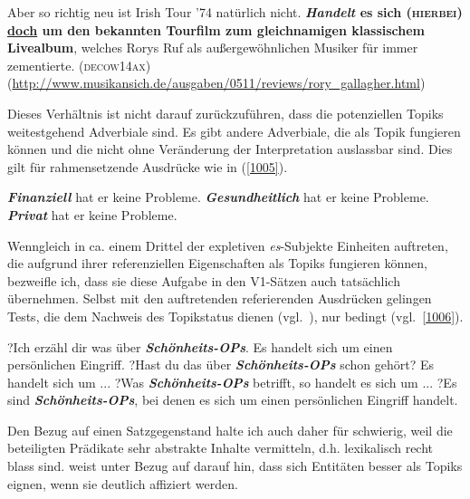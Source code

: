 \begin{exe}
	\ex\label{1004} 

	Aber so richtig neu ist Irish Tour '74 natürlich nicht. \textbf{\textit{Handelt} es sich (\textsc{hierbei}) \ul{doch} um den be\-kannten Tourfilm 		zum gleichnamigen klassischem Livealbum}, welches Rorys Ruf als außergewöhnlichen Musiker für immer zementierte.      		
	\hfill\hbox{\scshape(decow14ax)}
	\newline
	{\scriptsize(\url{http://www.musikansich.de/ausgaben/0511/reviews/rory\_gallagher.html})}
\end{exe}								                      
Dieses Verhältnis ist nicht darauf zurückzuführen, dass die potenziellen Topiks weitestgehend Adverbiale  sind. Es gibt andere Adverbiale, die als Topik fungieren können und die nicht ohne Veränderung der Interpretation auslassbar sind. Dies gilt für rahmensetzende Ausdrücke wie in (\ref{1005}).

\begin{exe}
	\ex\label{1005} 
		\begin{xlist}	
			\ex\label{1005a} \textbf{\textit{Finanziell}} hat er keine Probleme.
			\ex\label{1005b} \textbf{\textit{Gesundheitlich}} hat er keine Probleme.
			\ex\label{1005c} \textbf{\textit{Privat}} hat er keine Probleme.
			\hfill\hbox{\citet[42]{Helbig1981}}
		\end{xlist}
\end{exe}
Wenngleich in ca. einem Drittel der expletiven \textit{es}-Subjekte Einheiten auftreten, die aufgrund ihrer referenziellen Eigenschaften als Topiks fungieren können, bezweifle ich, dass sie diese Aufgabe in den V1-Sätzen auch tatsächlich überneh\-men. Selbst mit den auftretenden referierenden Ausdrücken gelingen Tests, die dem Nachweis des Topikstatus dienen (vgl.\ \citealt[28--29]{Musan2010}), nur bedingt (vgl.\ \ref{1006}).

\begin{exe}
	\ex\label{1006} 
		\begin{xlist}	
			\ex\label{1006a} ?Ich erzähl dir was über \textbf{\textit{Schönheits-OPs}}. Es handelt sich um einen persönlichen Eingriff.
			\ex\label{1006b} ?Hast du das über \textbf{\textit{Schönheits-OPs}} schon gehört? Es handelt sich um ...
			\ex\label{1006c} ?Was \textbf{\textit{Schönheits-OPs}} betrifft, so handelt es sich um ...
			\ex\label{1006d} ?Es sind \textbf{\textit{Schönheits-OPs}}, bei denen es sich um einen persönlichen Eingriff handelt.
		\end{xlist}
\end{exe}
Den Bezug auf einen Satzgegenstand halte ich auch daher für schwierig, weil die beteiligten Prädikate sehr abstrakte Inhalte vermitteln, d.h. lexikalisch recht blass sind. \citet[68]{Reinhart1981} weist unter Bezug auf \citet{Kuno1972} darauf hin, dass sich Entitäten besser als Topiks eignen, wenn sie deutlich affiziert werden.

